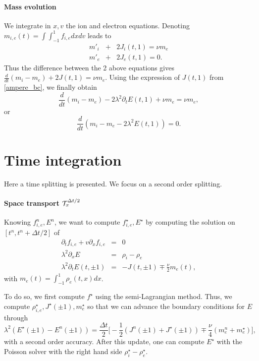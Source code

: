\documentclass[12pt,english]{article}
\theoremstyle{plain}\newtheorem{theorem}{Theorem}[section]
\theoremstyle{plain}\newtheorem{corollary}{Corollary}[section]
\theoremstyle{plain}\newtheorem{lemma}{Lemma}[section]
\begin{document}
\paragraph{Mass evolution\\}
We integrate in $x,v$ the ion and electron equations. Denoting $m_{i,e}(t)=\int \int_{-1}^1 f_{i,e} dxdv$ leads to 
\begin{eqnarray*}
m'_i &+& 2J_i(t, 1) = \nu m_e\nonumber\\
m'_e&+& 2J_e(t, 1) =0.  
\end{eqnarray*}
Thus the difference between the 2 above equations gives $\frac{d}{dt}(m_i-m_e) + 2J(t, 1) = \nu m_e$. 
Using the expression of $J(t, 1)$ from \eqref{ampere_bc}, we finally obtain 
$$
\frac{d}{dt}(m_i-m_e) - 2\lambda^2 \partial_t E(t, 1) + \nu m_e = \nu m_e, 
$$
or 
$$
\frac{d}{dt}(m_i-m_e - 2\lambda^2  E(t, 1)) = 0. 
$$


\section{Time integration}
Here a time splitting is presented. We focus on a second order splitting. 

\paragraph{Space transport ${\cal T}_x^{\Delta t/2}$}
Knowing $f^n_{i,e}, E^n$, we want to compute $f^\star_{i,e}, E^\star$ by computing the solution on $[t^n, t^n+\Delta t/2]$ of 
\begin{eqnarray*}
\partial_t f_{i,e} + v\partial_x f_{i,e} &=& 0\nonumber\\
\lambda^2\partial_x E &=& \rho_i-\rho_e\nonumber\\
\lambda^2\partial_t E(t, \pm 1) &=& -J(t, \pm 1) \mp \frac{\nu}{2} m_e(t),   
\end{eqnarray*}
with $m_e(t)=\int_{-1}^1 \rho_e(t, x)dx$. 

To do so, we first compute $f^\star$ using the semi-Lagrangian method. 
Thus, we compute $\rho_{i,e}^\star, J^\star(\pm 1), m_e^\star$ 
so that we can advance the boundary conditions for $E$ through 
$$
\lambda^2 (E^\star(\pm 1) -E^n(\pm 1)) =\frac{\Delta t}{2}\Big[ -\frac{1}{2}(J^n(\pm 1)+J^\star(\pm 1)) \mp \frac{\nu}{4}(m_e^n+m_e^\star)\Big],   
$$
with a second order accuracy. After this update, one can compute $E^\star$ with the Poisson solver with the right hand side 
$\rho_i^\star-\rho_e^\star$. 
\end{document}
